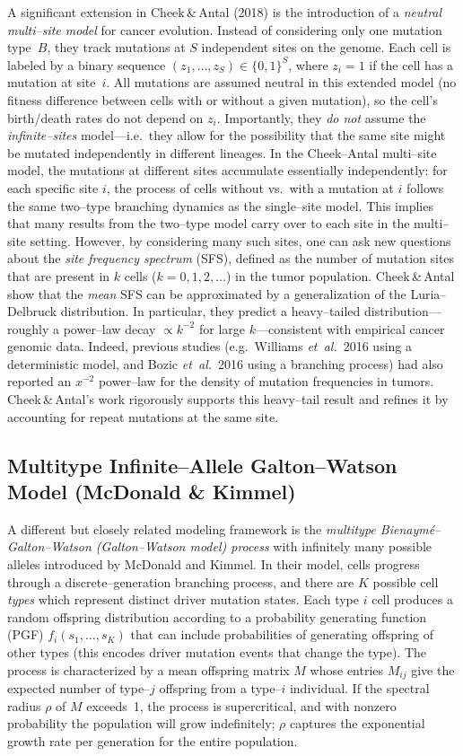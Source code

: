 \documentclass[11pt]{article}
\begin{document}
A significant extension in Cheek\,\&\,Antal (2018) is the introduction of a \emph{neutral multi--site model} for cancer evolution. Instead of considering only one mutation type~$B$, they track mutations at $S$ independent sites on the genome. Each cell is labeled by a binary sequence $(z_1,\dots,z_S)\in\{0,1\}^S$, where $z_i=1$ if the cell has a mutation at site~$i$. All mutations are assumed neutral in this extended model (no fitness difference between cells with or without a given mutation), so the cell’s birth/death rates do not depend on $z_i$. Importantly, they \emph{do not} assume the \emph{infinite--sites} model—i.e.~they allow for the possibility that the same site might be mutated independently in different lineages. In the Cheek--Antal multi--site model, the mutations at different sites accumulate essentially independently: for each specific site $i$, the process of cells without vs.~with a mutation at $i$ follows the same two--type branching dynamics as the single--site model. This implies that many results from the two--type model carry over to each site in the multi--site setting. However, by considering many such sites, one can ask new questions about the \emph{site frequency spectrum} (SFS), defined as the number of mutation sites that are present in $k$ cells ($k=0,1,2,\ldots$) in the tumor population. Cheek\,\&\,Antal show that the \emph{mean} SFS can be approximated by a generalization of the Luria--Delbruck distribution. In particular, they predict a heavy--tailed distribution—roughly a power--law decay $\propto k^{-2}$ for large $k$—consistent with empirical cancer genomic data. Indeed, previous studies (e.g.~Williams \emph{et~al.}~2016 using a deterministic model, and Bozic \emph{et~al.}~2016 using a branching process) had also reported an $x^{-2}$ power--law for the density of mutation frequencies in tumors. Cheek\,\&\,Antal’s work rigorously supports this heavy--tail result and refines it by accounting for repeat mutations at the same site.

\subsection{Multitype Infinite--Allele Galton--Watson Model (McDonald \& Kimmel)}
A different but closely related modeling framework is the \emph{multitype Bienaym\'e--Galton--Watson (Galton–Watson model) process} with infinitely many possible alleles introduced by McDonald and Kimmel. In their model, cells progress through a discrete--generation branching process, and there are $K$ possible cell \emph{types} which represent distinct driver mutation states. Each type $i$ cell produces a random offspring distribution according to a probability generating function (PGF) $f_i(s_1,\ldots,s_K)$ that can include probabilities of generating offspring of other types (this encodes driver mutation events that change the type). The process is characterized by a mean offspring matrix $M$ whose entries $M_{ij}$ give the expected number of type--$j$ offspring from a type--$i$ individual. If the spectral radius $\rho$ of $M$ exceeds~1, the process is supercritical, and with nonzero probability the population will grow indefinitely; $\rho$ captures the exponential growth rate per generation for the entire population.
\end{document}
